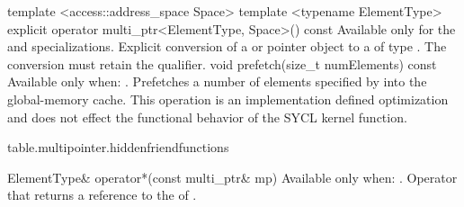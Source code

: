 \addRowThreeL
{template <access::address_space Space>}
{template <typename ElementType>}
{explicit operator multi_ptr<ElementType, Space>() const}
{Available only for the 
and  specializations.
\newline
Explicit conversion of a 
or  pointer object to a
 of type .}
The conversion must retain the  qualifier.
 \addRow
    { void prefetch(size_t numElements) const }
    {
      Available only when: .
      \newline
      Prefetches a number of elements specified by  into
      the \gls{global-memory} cache. This operation is an implementation defined
      optimization and does not effect the functional  behavior of the SYCL
      kernel function.
    }
\completeTable

{table.multipointer.hiddenfriendfunctions}

\addRow
{ElementType\& operator*(const multi_ptr\& mp)}
{Available only when: .
\newline
Operator that returns a reference to the 
of  .}

